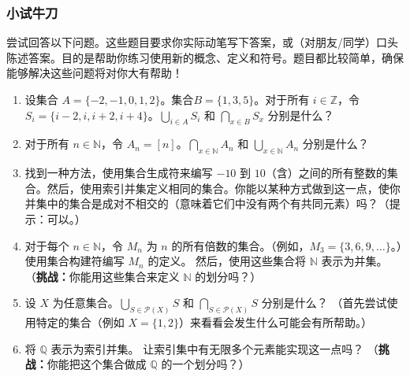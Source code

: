 \subsubsection*{小试牛刀}

尝试回答以下问题。这些题目要求你实际动笔写下答案，或（对朋友/同学）口头陈述答案。目的是帮助你练习使用新的概念、定义和符号。题目都比较简单，确保能够解决这些问题将对你大有帮助！

\begin{enumerate}[label=(\arabic*)]
    \item 设集合 $A = \{-2, -1, 0, 1, 2\}$。集合$ B = \{1, 3, 5\}$。对于所有 $i \in \mathbb{Z}$，令 $S_i = \{i - 2, i, i + 2, i + 4\}$。$\displaystyle{\bigcup_{i \in A}S_i}$ 和 $\displaystyle{\bigcap_{x \in B}S_x}$ 分别是什么？
    \item 对于所有 $n \in \mathbb{N}$，令 $A_n = [n]$。$\displaystyle{\bigcap_{x \in \mathbb{N}}A_n}$ 和 $\displaystyle{\bigcup_{x \in \mathbb{N}}A_n}$ 分别是什么？
    \item 找到一种方法，使用集合生成符来编写 $-10$ 到 $10$（含）之间的所有整数的集合。然后，使用索引并集定义相同的集合。你能以某种方式做到这一点，使你并集中的集合是成对不相交的（意味着它们中没有两个有共同元素）吗？（提示：可以。）
    \item 对于每个 $n \in \mathbb{N}$，令 $M_n$ 为 $n$ 的所有倍数的集合。（例如，$M_3 = \{3, 6, 9,\dots\}$。）使用集合构建符编写 $M_n$ 的定义。 然后，使用这些集合将 $\mathbb{N}$ 表示为并集。
    （\textbf{挑战：}你能用这些集合来定义 $\mathbb{N}$ 的划分吗？）
    \item 设 $X$ 为任意集合。$\displaystyle{\bigcup_{S \in \mathcal{P}(X)}S}$ 和 $\displaystyle{\bigcap_{S \in \mathcal{P}(X)}S}$ 分别是什么？
    （首先尝试使用特定的集合（例如 $X = \{1, 2\}$）来看看会发生什么可能会有所帮助。）
    \item 将 $\mathbb{Q}$ 表示为索引并集。
    让索引集中有无限多个元素能实现这一点吗？
    （\textbf{挑战：}你能把这个集合做成 $\mathbb{Q}$ 的一个划分吗？）
\end{enumerate}